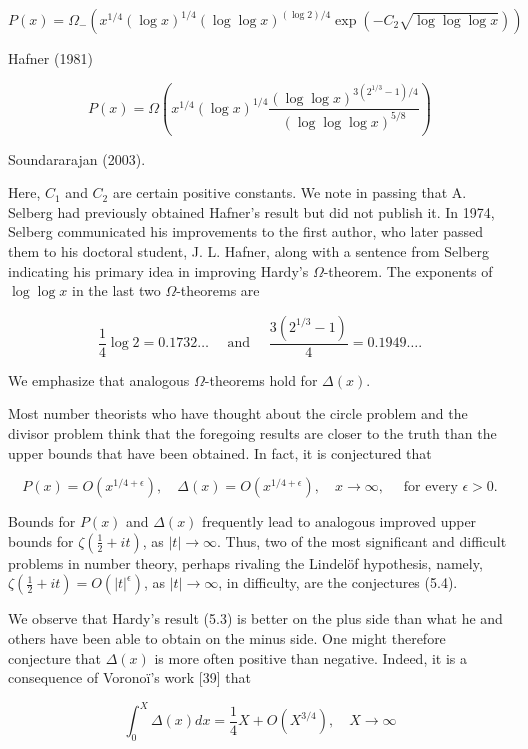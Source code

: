 \documentclass[10pt]{article}
\theoremstyle{plain}
\begin{document}
$$
P(x)=\Omega_{-}\left(x^{1 / 4}(\log x)^{1 / 4}(\log \log x)^{(\log 2) / 4} \exp \left(-C_{2} \sqrt{\log \log \log x}\right)\right)
$$

Hafner (1981)

$$
P(x)=\Omega\left(x^{1 / 4}(\log x)^{1 / 4} \frac{(\log \log x)^{3\left(2^{1 / 3}-1\right) / 4}}{(\log \log \log x)^{5 / 8}}\right)
$$

Soundararajan (2003).

Here, $C_{1}$ and $C_{2}$ are certain positive constants. We note in passing that A. Selberg had previously obtained Hafner's result but did not publish it. In 1974, Selberg communicated his improvements to the first author, who later passed them to his doctoral student, J. L. Hafner, along with a sentence from Selberg indicating his primary idea in improving Hardy's $\Omega$-theorem. The exponents of $\log \log x$ in the last two $\Omega$-theorems are

$$
\frac{1}{4} \log 2=0.1732 \ldots \quad \text { and } \quad \frac{3\left(2^{1 / 3}-1\right)}{4}=0.1949 \ldots .
$$

We emphasize that analogous $\Omega$-theorems hold for $\Delta(x)$.

Most number theorists who have thought about the circle problem and the divisor problem think that the foregoing results are closer to the truth than the upper bounds that have been obtained. In fact, it is conjectured that


\begin{equation*}
P(x)=O\left(x^{1 / 4+\epsilon}\right), \quad \Delta(x)=O\left(x^{1 / 4+\epsilon}\right), \quad x \to \infty, \quad \text { for every } \epsilon>0 . \tag{5.4}
\end{equation*}


Bounds for $P(x)$ and $\Delta(x)$ frequently lead to analogous improved upper bounds for $\zeta\left(\frac{1}{2}+i t\right)$, as $|t| \to \infty$. Thus, two of the most significant and difficult problems in number theory, perhaps rivaling the Lindelöf hypothesis, namely, $\zeta\left(\frac{1}{2}+i t\right)=O\left(|t|^{\epsilon}\right)$, as $|t| \to \infty$, in difficulty, are the conjectures (5.4).

We observe that Hardy's result (5.3) is better on the plus side than what he and others have been able to obtain on the minus side. One might therefore conjecture that $\Delta(x)$ is more often positive than negative. Indeed, it is a consequence of Voronoï's work [39] that

$$
\int_{0}^{X} \Delta(x) d x=\frac{1}{4} X+O\left(X^{3 / 4}\right), \quad X \to \infty
$$
\end{document}
